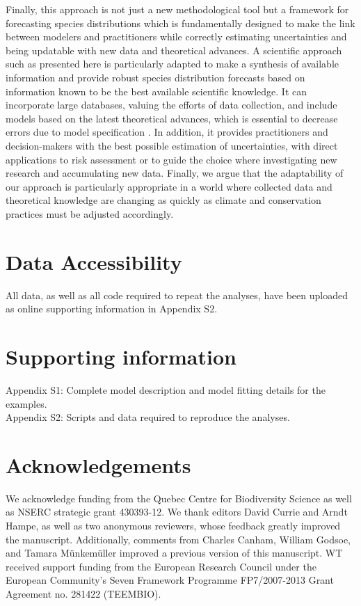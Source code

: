\documentclass[11pt]{article}
\begin{document}
Finally, this approach is not just a new methodological tool but a framework for forecasting species distributions which is fundamentally designed to make the link between modelers and practitioners while correctly estimating uncertainties and being updatable with new data and theoretical advances. 
A scientific approach such as presented here is particularly adapted to make a synthesis of available information and provide robust species distribution forecasts based on information known to be the best available scientific knowledge. 
It can incorporate large databases, valuing the efforts of data collection, and include models based on the latest theoretical advances, which is essential to decrease errors due to model specification \citep{Austin2007}. 
In addition, it provides practitioners and decision-makers with the best possible estimation of uncertainties, with direct applications to risk assessment or to guide the choice where investigating new research and accumulating new data. 
Finally, we argue that the adaptability of our approach is particularly appropriate in a world where collected data and theoretical knowledge are changing as quickly as climate and conservation practices must be adjusted accordingly.

\section*{Data Accessibility}
All data, as well as all code required to repeat the analyses, have been uploaded as online supporting information in Appendix S2.


%
%
\section*{Supporting information}
Appendix S1: Complete model description and model fitting details for the examples. \\
Appendix S2: Scripts and data required to reproduce the analyses.

\section*{Acknowledgements}
We acknowledge funding from the Quebec Centre for Biodiversity Science as well as NSERC strategic grant 430393-12. We thank editors David Currie and Arndt Hampe, as well as two anonymous reviewers, whose feedback greatly improved the manuscript. Additionally, comments from Charles Canham, William Godsoe, and Tamara Münkemüller improved a previous version of this manuscript. WT received support funding from the European Research Council under the European Community's Seven Framework Programme FP7/2007-2013 Grant Agreement no. 281422 (TEEMBIO). 
\end{document}
